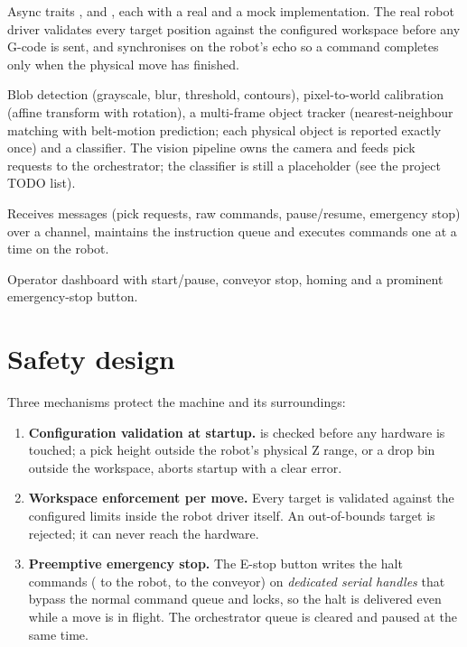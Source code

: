 \begin{description}[style=nextline]
  \item[Hardware layer (\cfg{src/hardware.rs})]
    Async traits ,  and
    , each with a real and a mock implementation.
    The real robot driver validates every target position against the
    configured workspace before any G-code is sent, and synchronises on
    the robot's  echo so a command completes only when the
    physical move has finished.
  \item[Vision layer (\cfg{src/vision/})]
    Blob detection (grayscale, blur, threshold, contours), pixel-to-world
    calibration (affine transform with rotation), a multi-frame object
    tracker (nearest-neighbour matching with belt-motion prediction; each
    physical object is reported exactly once) and a classifier. The
    vision pipeline owns the camera and feeds pick requests to the
    orchestrator; the classifier is still a placeholder (see the project
    TODO list).
  \item[Orchestrator (\cfg{src/orchestrator.rs})]
    Receives messages (pick requests, raw commands, pause/resume,
    emergency stop) over a channel, maintains the instruction queue and
    executes commands one at a time on the robot.
  \item[UI (\cfg{ui/app\_window.slint})]
    Operator dashboard with start/pause, conveyor stop, homing and a
    prominent emergency-stop button.
\end{description}

\section{Safety design}
\label{sec:safety}
%
Three mechanisms protect the machine and its surroundings:
\begin{enumerate}
  \item \textbf{Configuration validation at startup.} 
    is checked before any hardware is touched; a pick height outside the
    robot's physical Z range, or a drop bin outside the workspace, aborts
    startup with a clear error.
  \item \textbf{Workspace enforcement per move.} Every 
    target is validated against the configured limits inside the robot
    driver itself. An out-of-bounds target is rejected; it can never reach
    the hardware.
  \item \textbf{Preemptive emergency stop.} The E-stop button writes the
    halt commands ( to the robot,  to the conveyor) on
    \emph{dedicated serial handles} that bypass the normal command queue
    and locks, so the halt is delivered even while a move is in flight.
    The orchestrator queue is cleared and paused at the same time.
\end{enumerate}


